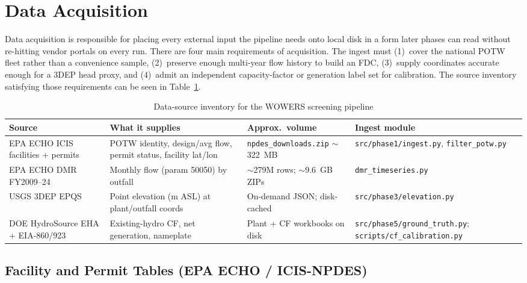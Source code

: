 \documentclass[12pt,letterpaper]{report}
\begin{document}
\section{Data Acquisition}                               %

Data acquisition is responsible for placing every external input the pipeline
needs onto local disk in a form later phases can read without re-hitting vendor
portals on every run. There are four main requirements of acquisition. The
ingest must (1)~cover the national POTW fleet rather than a convenience sample,
(2)~preserve enough multi-year flow history to build an FDC, (3)~supply
coordinates accurate enough for a 3DEP head proxy, and (4)~admit an independent
capacity-factor or generation label set for calibration. The source inventory
satisfying those requirements can be seen in Table~\ref{tab:data_sources}.

\begin{table}[htbp]
  \centering
  \caption{Data-source inventory for the WOWERS screening pipeline}
  \label{tab:data_sources}
  \footnotesize
  \begin{tabular}{@{}p{2.2cm}p{3.8cm}p{3.4cm}p{4.4cm}@{}}
    \toprule
    Source & What it supplies & Approx.\ volume & Ingest module \\
    \midrule
    EPA ECHO ICIS facilities + permits
      & POTW identity, design/avg flow, permit status, facility lat/lon
      & \texttt{npdes\_downloads.zip} $\sim$322~MB
      & \texttt{src/phase1/\allowbreak ingest.py}, \texttt{filter\_potw.py} \\
    EPA ECHO DMR FY2009--24
      & Monthly flow (param 50050) by outfall
      & $\sim$279M rows; $\sim$9.6~GB ZIPs
      & \texttt{dmr\_timeseries.py} \\
    USGS 3DEP EPQS
      & Point elevation (m ASL) at plant/outfall coords
      & On-demand JSON; disk-cached
      & \texttt{src/phase3/\allowbreak elevation.py} \\
    DOE HydroSource EHA + EIA-860/923
      & Existing-hydro CF, net generation, nameplate
      & Plant + CF workbooks on disk
      & \texttt{src/phase5/\allowbreak ground\_truth.py}; \texttt{scripts/\allowbreak cf\_calibration.py} \\
    \bottomrule
  \end{tabular}
\end{table}

\subsection{Facility and Permit Tables (EPA ECHO / ICIS-NPDES)}
\end{document}

